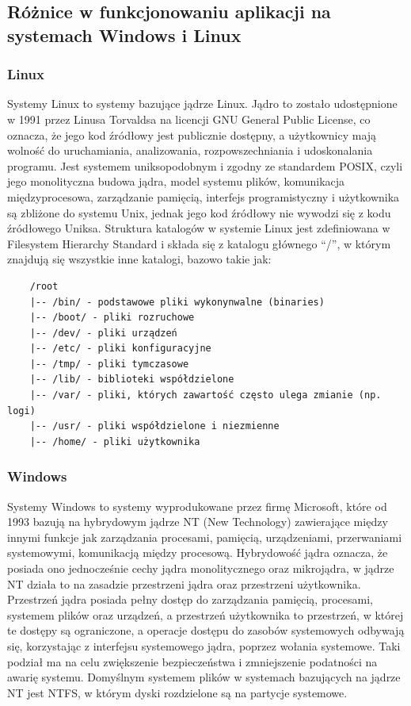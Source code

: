 \subsection{Różnice w funkcjonowaniu aplikacji na systemach Windows i Linux}
\subsubsection{Linux}
Systemy Linux to systemy bazujące jądrze Linux. Jądro to zostało udostępnione w 1991 przez Linusa Torvaldsa na licencji GNU General Public License, co oznacza, że jego kod źródłowy jest publicznie dostępny, a użytkownicy mają wolność do uruchamiania, analizowania, rozpowszechniania i udoskonalania programu.
Jest systemem uniksopodobnym i zgodny ze standardem POSIX, czyli jego monolityczna budowa jądra, model systemu plików, komunikacja międzyprocesowa, zarządzanie pamięcią, interfejs programistyczny i użytkownika są zbliżone do systemu Unix, jednak jego kod źródłowy nie wywodzi się z kodu źródłowego Uniksa. Struktura katalogów w systemie Linux jest zdefiniowana w Filesystem Hierarchy Standard \cite{linuxFhs} i składa się z katalogu głównego “/”, w którym znajdują się wszystkie inne katalogi, bazowo takie jak:
\begin{verbatim}
    /root
    |-- /bin/ - podstawowe pliki wykonynwalne (binaries)
    |-- /boot/ - pliki rozruchowe
    |-- /dev/ - pliki urządzeń
    |-- /etc/ - pliki konfiguracyjne
    |-- /tmp/ - pliki tymczasowe
    |-- /lib/ - biblioteki współdzielone
    |-- /var/ - pliki, których zawartość często ulega zmianie (np. logi)
    |-- /usr/ - pliki współdzielone i niezmienne
    |-- /home/ - pliki użytkownika
\end{verbatim}

\subsubsection{Windows}
Systemy Windows to systemy wyprodukowane przez firmę Microsoft, które od 1993 bazują na hybrydowym jądrze\cite{windowsHybridKernel} NT (New Technology)\cite{windowsNT} zawierające między innymi funkcje jak zarządzania procesami, pamięcią, urządzeniami, przerwaniami systemowymi, komunikacją między procesową. Hybrydowość jądra oznacza, że posiada ono jednocześnie cechy jądra monolitycznego oraz mikrojądra, w jądrze NT działa to na zasadzie przestrzeni jądra oraz przestrzeni użytkownika. Przestrzeń jądra posiada pełny dostęp do zarządzania pamięcią, procesami, systemem plików oraz urządzeń, a przestrzeń użytkownika to przestrzeń, w której te dostępy są ograniczone, a operacje dostępu do zasobów systemowych odbywają się, korzystając z interfejsu systemowego jądra, poprzez wołania systemowe. Taki podział ma na celu zwiększenie bezpieczeństwa i zmniejszenie podatności na awarię systemu. Domyślnym systemem plików w systemach bazujących na jądrze NT jest NTFS, w którym dyski rozdzielone są na partycje systemowe.

